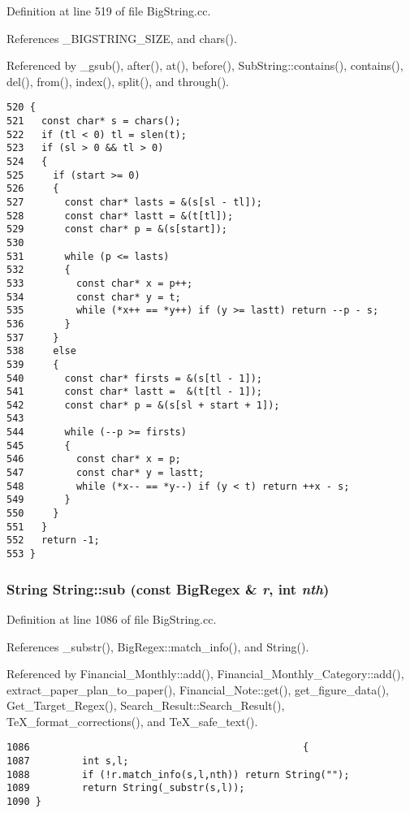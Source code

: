 Definition at line 519 of file Big\-String.cc.

References \_\-BIGSTRING\_\-SIZE, and chars().

Referenced by \_\-gsub(), after(), at(), before(), Sub\-String::contains(), contains(), del(), from(), index(), split(), and through().



\footnotesize\begin{verbatim}520 {
521   const char* s = chars();
522   if (tl < 0) tl = slen(t);
523   if (sl > 0 && tl > 0)
524   {
525     if (start >= 0)
526     {
527       const char* lasts = &(s[sl - tl]);
528       const char* lastt = &(t[tl]);
529       const char* p = &(s[start]);
530 
531       while (p <= lasts)
532       {
533         const char* x = p++;
534         const char* y = t;
535         while (*x++ == *y++) if (y >= lastt) return --p - s;
536       }
537     }
538     else
539     {
540       const char* firsts = &(s[tl - 1]);
541       const char* lastt =  &(t[tl - 1]);
542       const char* p = &(s[sl + start + 1]); 
543 
544       while (--p >= firsts)
545       {
546         const char* x = p;
547         const char* y = lastt;
548         while (*x-- == *y--) if (y < t) return ++x - s;
549       }
550     }
551   }
552   return -1;
553 }
\end{verbatim}\normalsize 
{}
\subsubsection{\setlength{\rightskip}{0pt plus 5cm}String String::sub (const {\bf Big\-Regex} \& {\em r}, int {\em nth})}\label{classString_a82}




Definition at line 1086 of file Big\-String.cc.

References \_\-substr(), Big\-Regex::match\_\-info(), and String().

Referenced by Financial\_\-Monthly::add(), Financial\_\-Monthly\_\-Category::add(), extract\_\-paper\_\-plan\_\-to\_\-paper(), Financial\_\-Note::get(), get\_\-figure\_\-data(), Get\_\-Target\_\-Regex(), Search\_\-Result::Search\_\-Result(), Te\-X\_\-format\_\-corrections(), and Te\-X\_\-safe\_\-text().



\footnotesize\begin{verbatim}1086                                               {
1087         int s,l;
1088         if (!r.match_info(s,l,nth)) return String("");
1089         return String(_substr(s,l));
1090 }
\end{verbatim}\normalsize 
{}
